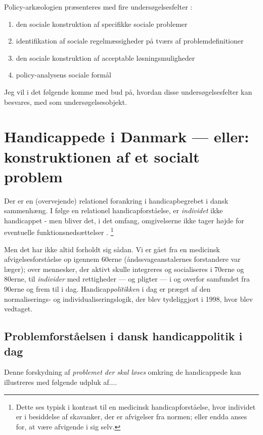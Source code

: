 Policy-arkæologien præsenteres med fire undersøgelsesfelter \autocite[s. 300]{scheurichPolicyArchaeologyNew1994}:
\begin{enumerate}
  \item
    den sociale konstruktion af specifikke sociale problemer
  \item
    identifikation af sociale regelmæssigheder på tværs af problemdefinitioner
  \item
    den sociale konstruktion af acceptable løsningsmuligheder
  \item
    policy-analysens sociale formål
\end{enumerate}

Jeg vil i det følgende komme med bud på, hvordan disse undersøgelsesfelter kan besvares, med  som undersøgelsesobjekt. 

\section{Handicappede i Danmark — eller: konstruktionen af et socialt problem}
Der er en (overvejende) relationel forankring i handicapbegrebet i dansk sammenhæng.
I følge en relationel handicapforståelse, er \textit{individet} ikke handicappet - men bliver det, i det omfang, omgivelserne ikke tager højde for eventuelle funktionsnedsættelser .
\footnote{Dette ses typisk i kontrast til en medicinsk handicapforståelse, hvor individet er i besiddelse af skavanker, der er afvigelser fra normen; eller endda anses for, at være afvigende i sig selv.}

Men det har ikke altid forholdt sig sådan.
Vi er gået fra en medicinsk afvigelsesforståelse op igennem 60erne (åndssvageanstalernes forstandere var læger); over mennesker, der aktivt skulle integreres og socialiseres i 70erne og 80erne, til \textit{individer} med rettigheder — og pligter — i og overfor samfundet fra 90erne og frem til i dag.
Handicap\textit{politikken} i dag er præget af den normaliserings- og individualiseringslogik,  der blev tydeliggjort i 1998, hvor  blev vedtaget.

\subsection{Problemforståelsen i dansk handicappolitik i dag}
Denne forskydning af \textit{problemet der skal løses} omkring de handicappede kan illustreres med følgende udpluk af....

